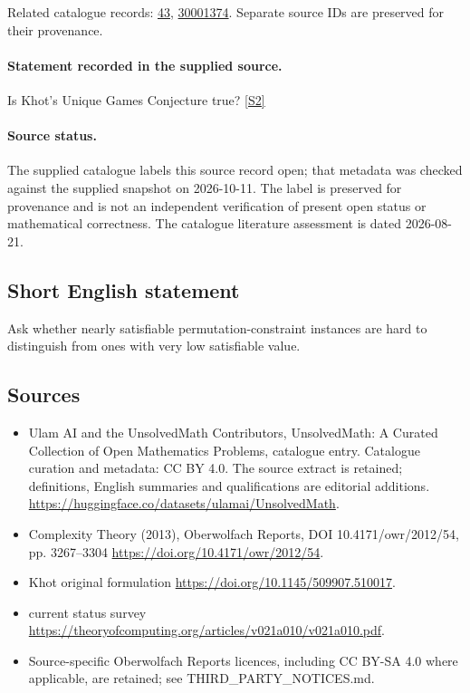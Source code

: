 \documentclass[11pt]{article}
\begin{document}
Related catalogue records: \href{https://mehmetmars7.github.io/Erdosproblems-llm-hunter/problem.html?type=open_problems&id=43}{43}, \href{https://mehmetmars7.github.io/Erdosproblems-llm-hunter/problem.html?type=open_problems&id=30001374}{30001374}. Separate source IDs are preserved for their provenance.
\paragraph{Statement recorded in the supplied source.}
Is Khot's Unique Games Conjecture true? \href{https://doi.org/10.4171/owr/2012/54}{[S2]}
\paragraph{Source status.}
The supplied catalogue labels this source record open; that metadata was checked against the supplied snapshot on 2026-10-11. The label is preserved for provenance and is not an independent verification of present open status or mathematical correctness. The catalogue literature assessment is dated 2026-08-21.
\subsection{Short English statement}
Ask whether nearly satisfiable permutation-constraint instances are hard to distinguish from ones with very low satisfiable value.
\subsection{Sources}
\begin{itemize}
\item[S1] Ulam AI and the UnsolvedMath Contributors, UnsolvedMath: A Curated Collection of Open Mathematics Problems, catalogue entry. Catalogue curation and metadata: CC BY 4.0. The source extract is retained; definitions, English summaries and qualifications are editorial additions.
\url{https://huggingface.co/datasets/ulamai/UnsolvedMath}.
\item[S2] Complexity Theory (2013), Oberwolfach Reports, DOI 10.4171/owr/2012/54, pp. 3267--3304
\url{https://doi.org/10.4171/owr/2012/54}.
\item[S3] Khot original formulation
\url{https://doi.org/10.1145/509907.510017}.
\item[S4] current status survey
\url{https://theoryofcomputing.org/articles/v021a010/v021a010.pdf}.
\item Source-specific Oberwolfach Reports licences, including CC BY-SA 4.0 where applicable, are retained; see THIRD\_PARTY\_NOTICES.md.
\end{itemize}
\end{document}
